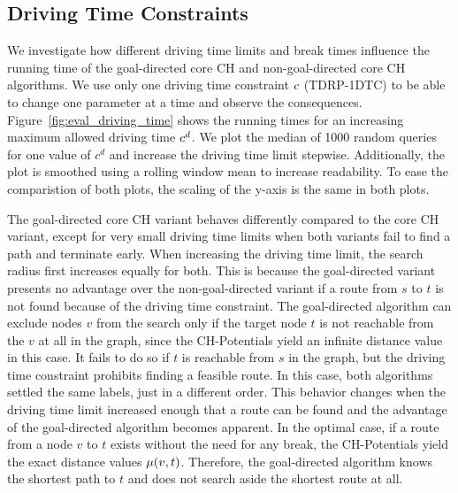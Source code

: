 \subsection{Driving Time Constraints}
We investigate how different driving time limits and break times influence the running time of the goal-directed core CH and non-goal-directed core CH algorithms. We use only one driving time constraint $c$ (TDRP-1DTC) to be able to change one parameter at a time and observe the consequences. Figure~\ref{fig:eval_driving_time} shows the running times for an increasing maximum allowed driving time $c^d$. We plot the median of 1000 random queries for one value of $c^d$ and increase the driving time limit stepwise. Additionally, the plot is smoothed using a rolling window mean to increase readability. To ease the comparistion of both plots, the scaling of the y-axis is the same in both plots.

The goal-directed core CH variant behaves differently compared to the core CH variant, except for very small driving time limits when both variants fail to find a path and terminate early. When increasing the driving time limit, the search radius first increases equally for both. This is because the goal-directed variant presents no advantage over the non-goal-directed variant if a route from $s$ to $t$ is not found because of the driving time constraint. The goal-directed algorithm can exclude nodes $v$ from the search only if the target node $t$ is not reachable from the $v$ at all in the graph, since the CH-Potentials yield an infinite distance value in this case. It fails to do so if $t$ is reachable from $s$ in the graph, but the driving time constraint prohibits finding a feasible route. In this case, both algorithms settled the same labels, just in a different order. This behavior changes when the driving time limit increased enough that a route can be found and the advantage of the goal-directed algorithm becomes apparent. In the optimal case, if a route from a node $v$ to $t$ exists without the need for any break, the CH-Potentials yield the exact distance values $\mu(v,t)$. Therefore, the goal-directed algorithm knows the shortest path to $t$ and does not search aside the shortest route at all.

